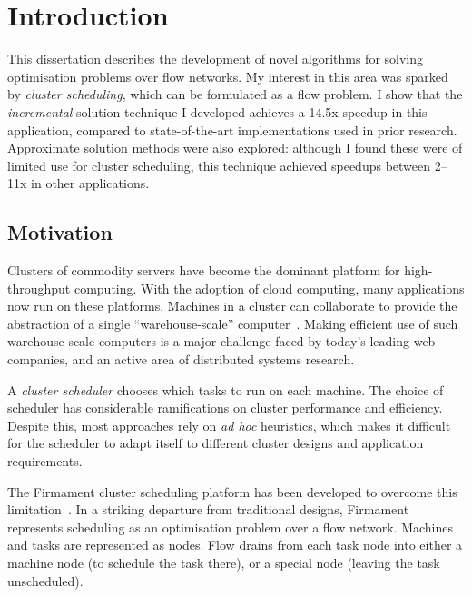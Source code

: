 \chapter{Introduction} \label{chap:intro}


This dissertation describes the development of novel algorithms for solving optimisation problems over flow networks. My interest in this area was sparked by \emph{cluster scheduling}, which can be formulated as a flow problem. I show that the \emph{incremental} solution technique I developed achieves a 14.5x speedup in this application, compared to state-of-the-art implementations used in prior research. Approximate solution methods were also explored: although I found these were of limited use for cluster scheduling, this technique achieved speedups between 2--11x in other applications.

\section{Motivation} \label{sec:intro-motivation}
Clusters of commodity servers have become the dominant platform for high-throughput computing. With the adoption of cloud computing, many applications now run on these platforms. Machines in a cluster can collaborate to provide the abstraction of a single ``warehouse-scale'' computer~\cite{WarehouseScale:2009}. Making efficient use of such warehouse-scale computers is a major challenge faced by today's leading web companies, and an active area of distributed systems research.

A \emph{cluster scheduler} chooses which tasks to run on each machine. The choice of scheduler has considerable ramifications on cluster performance and efficiency. Despite this, most approaches rely on \emph{ad hoc} heuristics, which makes it difficult for the scheduler to adapt itself to different cluster designs and application requirements.

The Firmament cluster scheduling platform has been developed to overcome this limitation\footnotemark~\cite[ch.~5]{Schwarzkopf:2015}. In a striking departure from traditional designs, Firmament represents scheduling as an optimisation problem over a flow network. Machines and tasks are represented as nodes. Flow drains from each task node into either a machine node (to schedule the task there), or a special node (leaving the task unscheduled).

